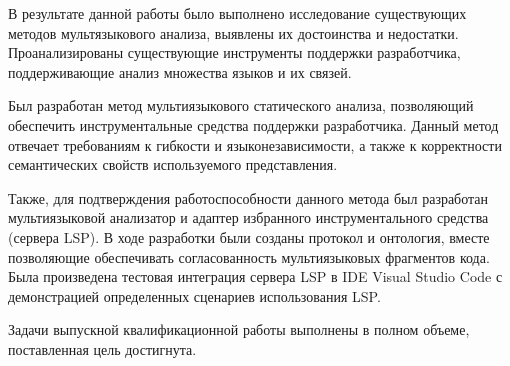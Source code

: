\Conclusion %

В результате данной работы было выполнено исследование существующих методов мультязыкового анализа,
выявлены их достоинства и недостатки. Проанализированы существующие инструменты поддержки разработчика,
поддерживающие анализ множества языков и их связей.

Был разработан метод мультиязыкового статического анализа, позволяющий
обеспечить инструментальные средства поддержки разработчика. Данный метод отвечает требованиям
к гибкости и языконезависимости, а также к корректности семантических свойств используемого представления.

Также, для подтверждения работоспособности данного метода был разработан мультиязыковой анализатор
и адаптер избранного инструментального средства (сервера LSP). В ходе разработки были созданы
протокол и онтология, вместе позволяющие обеспечивать согласованность мультиязыковых фрагментов
кода. Была произведена тестовая интеграция сервера LSP в IDE Visual Studio Code с демонстрацией определенных
сценариев использования LSP.

Задачи выпускной квалификационной работы выполнены в полном объеме, поставленная цель достигнута.

